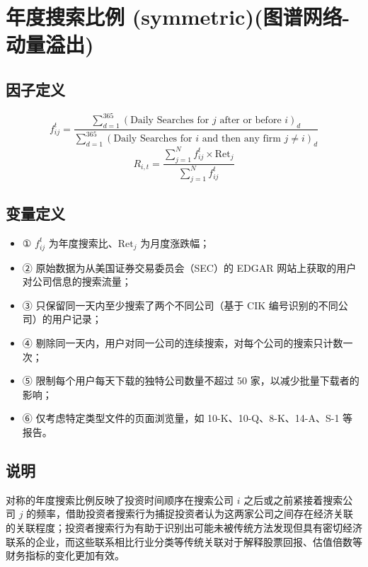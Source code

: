 \documentclass{article}
\begin{document}
\section{年度搜索比例 (symmetric)(图谱网络-动量溢出)}

\subsection{因子定义}
\begin{equation}
    f_{ij}^t = \frac{\sum_{d=1}^{365} (\text{Daily Searches for } j \text{ after or before } i)_d}{\sum_{d=1}^{365} (\text{Daily Searches for } i \text{ and then any firm } j \neq i)_d}
\end{equation}
\begin{equation}
    R_{i,t} = \frac{\sum_{j=1}^N f_{ij}^t \times \mathrm{Ret}_j}{\sum_{j=1}^N f_{ij}^t}
\end{equation}

\subsection{变量定义}
\begin{itemize}
    \item ① \( f_{ij}^t \) 为年度搜索比、\( \mathrm{Ret}_j \) 为月度涨跌幅；
    \item ② 原始数据为从美国证券交易委员会（SEC）的 EDGAR 网站上获取的用户对公司信息的搜索流量；
    \item ③ 只保留同一天内至少搜索了两个不同公司（基于 CIK 编号识别的不同公司）的用户记录；
    \item ④ 剔除同一天内，用户对同一公司的连续搜索，对每个公司的搜索只计数一次；
    \item ⑤ 限制每个用户每天下载的独特公司数量不超过 50 家，以减少批量下载者的影响；
    \item ⑥ 仅考虑特定类型文件的页面浏览量，如 10-K、10-Q、8-K、14-A、S-1 等报告。
\end{itemize}

\subsection{说明}
对称的年度搜索比例反映了投资时间顺序在搜索公司 \( i \) 之后或之前紧接着搜索公司 \( j \) 的频率，借助投资者搜索行为捕捉投资者认为这两家公司之间存在经济关联的关联程度；投资者搜索行为有助于识别出可能未被传统方法发现但具有密切经济联系的企业，而这些联系相比行业分类等传统关联对于解释股票回报、估值倍数等财务指标的变化更加有效。
\end{document}
